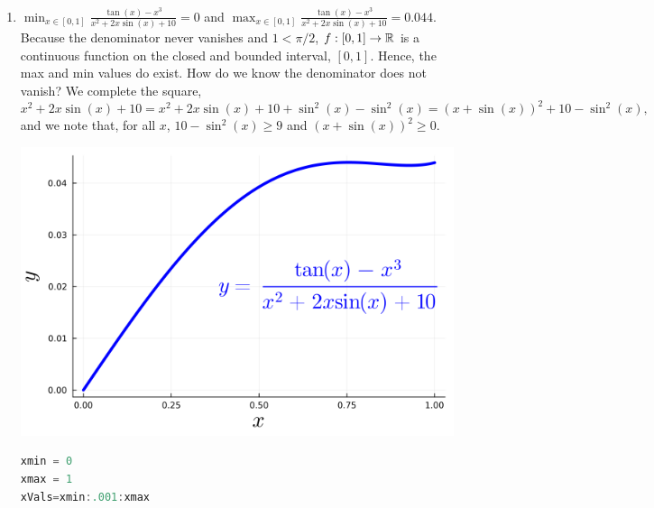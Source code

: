 \begin{enumerate}
\begin{lstlisting}[language=Julia,style=mystyle]
f(x) = (2x + 1)/(x^2 + 1)

y = f.(xVals)

p1 = plot(xVals,y, linewidth=4, color=:blue, label=false)
plot!(xlabel=L"$x$", ylabel=L"$y= \frac{2x + 1}{x^2 + 1}$") 

@show MaxF = maximum(y)
@show MinF = minimum(y)

max_value, index = findmax(y)

println("Maximum value: ", max_value)
println("x^*: ", xVals[index] )

display(p1)

png(p1, "MaxMinD")
\end{lstlisting}
\textbf{Output} 
\begin{verbatim}
MaxF = maximum(y) = 1.6180294712510837
MinF = minimum(y) = 0.4230769230769231
Maximum value: 1.6180294712510837
x^*: 0.62
\end{verbatim}



    \item  \Ans  $\displaystyle \min_{x \in [0, 1]} \frac{\tan(x) - x^3}{x^2 + 2 x \sin(x) + 10} = 0$ and  $\displaystyle \max_{x \in [0, 1]} \frac{\tan(x) - x^3}{x^2 + 2 x \sin(x) + 10} =  0.044$.\\  
    
    Because the denominator never vanishes and $1 < \pi/2$, $f:[0, 1] \to \mathbb R$ is a continuous function on the closed and bounded interval, $[0, 1]$. Hence, the max and min values do exist. How do we know the denominator does not vanish? We complete the square,
    $$ x^2 + 2 x \sin(x) + 10 = x^2 + 2 x \sin(x) + 10 + \sin^2(x) -  \sin^2(x) = (x + \sin(x))^2 + 10  -  \sin^2(x),$$
    and we note that, for all $x$, $10-\sin^2(x) \ge 9$ and $ (x + \sin(x))^2 \ge 0$.

    
    \begin{center}
    \includegraphics[width=0.45\columnwidth]{graphics/Chap04/MaxMinE.png}
    \end{center}
    
    
\begin{lstlisting}[language=Julia,style=mystyle]
xmin = 0
xmax = 1
xVals=xmin:.001:xmax


\end{lstlisting}
\end{enumerate}
